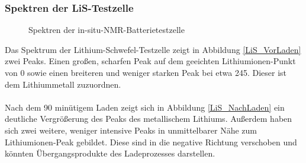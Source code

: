 \documentclass[a4paper, 11pt, headsepline,footsepline,twoside,abstract]{scrbook}
\begin{document}
\subsubsection{Spektren der LiS-Testzelle}
\begin{figure}
   \centering
       \vspace{10mm}
       \vspace{6mm}
	\caption{Spektren der in-situ-NMR-Batterietestzelle}
   	\label{insitu_nmr}
\end{figure}  
Das Spektrum der Lithium-Schwefel-Testzelle zeigt in Abbildung \ref{LiS_VorLaden} zwei Peaks. Einen großen, scharfen Peak auf dem geeichten Lithiumionen-Punkt von \SI{0}{\nmrppm} sowie einen breiteren und weniger starken Peak bei etwa \SI{245}{\nmrppm}. Dieser ist dem Lithiummetall zuzuordnen.
\\\\
Nach dem 90 minütigem Laden zeigt sich in Abbildung \ref{LiS_NachLaden} ein deutliche Vergrößerung des Peaks des metallischem Lithiums. Außerdem haben sich zwei weitere, weniger intensive Peaks in unmittelbarer Nähe zum Lithiumionen-Peak gebildet. Diese sind in die negative Richtung verschoben und könnten Übergangsprodukte des Ladeprozesses darstellen.
\newpage
\end{document}
